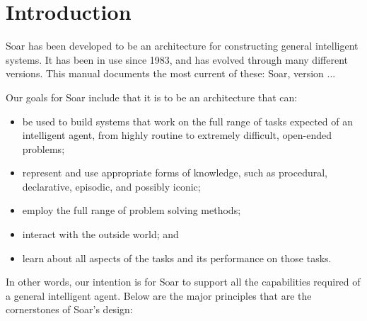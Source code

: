 \chapter{Introduction}
\label{INTRO}

Soar has been developed to be an architecture for constructing general
intelligent systems. It has been in use since 1983, and has evolved through
many different versions. This manual documents the most current of these:
Soar, version \SoarVersionMajor.\SoarVersionMinor.\SoarVersionRevision.

Our goals for Soar include that it is to be an architecture that can: \vspace{-12pt}

\begin{itemize} 
\item be used to build systems that work on the full range of tasks expected
	of an \linebreak intelligent agent, from highly routine to extremely difficult,
	open-ended problems;\vspace{-6pt}
\item represent and use appropriate forms of knowledge, such as procedural,
	declarative, episodic, and possibly iconic;\vspace{-6pt}
\item employ the full range of problem solving methods;\vspace{-6pt}
\item interact with the outside world; and\vspace{-6pt}
\item learn about all aspects of the tasks and its performance on those tasks.
\end{itemize} 

In other words, our intention is for Soar to support all the capabilities
required of a general intelligent agent. Below are the major principles that
are the cornerstones of Soar's design:  \vspace{-12pt}

